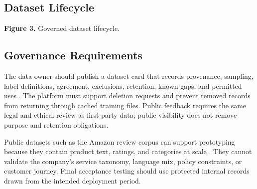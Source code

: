 \documentclass[11pt,a4paper,twoside]{article}
\begin{document}
\subsection{Dataset Lifecycle}

\begin{center}

\vspace{0.1em}
{\small\textbf{Figure 3.} Governed dataset lifecycle.}
\end{center}

\subsection{Governance Requirements}

The data owner should publish a dataset card that records provenance, sampling, label definitions, agreement, exclusions, retention, known gaps, and permitted uses \cite{gebru2021}. The platform must support deletion requests and prevent removed records from returning through cached training files. Public feedback requires the same legal and ethical review as first-party data; public visibility does not remove purpose and retention obligations.

Public datasets such as the Amazon review corpus can support prototyping because they contain product text, ratings, and categories at scale \cite{ni2019}. They cannot validate the company's service taxonomy, language mix, policy constraints, or customer journey. Final acceptance testing should use protected internal records drawn from the intended deployment period.

\newpage
\end{document}
